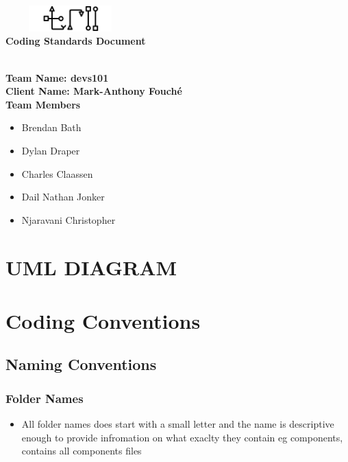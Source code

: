\documentclass[12pt]{article}
\begin{document}
{\centering
	\includegraphics[width=5cm, height=1cm]{cos301logofinal.jpg}\\ 
	\textbf{Coding Standards Document}
	
	\noindent\makebox[\linewidth]{\rule{\paperwidth}{0.4pt}}\\ 
	\vspace*{100px}
	\textbf{Team Name: devs101} \\
	\textbf{Client Name: Mark-Anthony Fouch\'e}\\
		\vspace*{10px}
	\textbf{Team Members}\\
		\vspace*{3px}
		\begin{center}
      	\begin{itemize}
      	
      	\item Brendan Bath
      	\item Dylan Draper
      	\item Charles Claassen
      		\item Dail Nathan Jonker
      	\item Njaravani Christopher
        \end{itemize}
     \end{center}
     
     }
     \newpage
      \section{UML DIAGRAM }
     \section{Coding Conventions}
     \subsection{Naming Conventions}
     
     \subsubsection{Folder Names}
     \begin{itemize}
      	\item All folder names does start with a small letter and the name is descriptive enough to provide infromation on what exaclty they contain eg components, contains all components files
      	\end{itemize}
\end{document}
